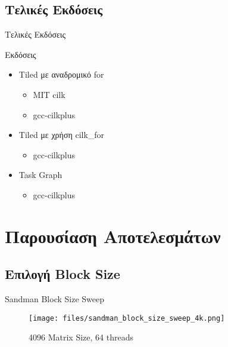 \documentclass{beamer}
\begin{document}
\subsection{Τελικές Εκδόσεις}
\begin{frame}{Τελικές Εκδόσεις}
    \begin{block}{Εκδόσεις }
        \begin{itemize}
            \item<1-> Tiled με αναδρομικό for
                \begin{itemize}
                    \item<2-> MIT cilk
                    \item<3-> gcc-cilkplus
                \end{itemize}
            \item<4-> Tiled με χρήση cilk\_for
                \begin{itemize}
                    \item<5-> gcc-cilkplus
                \end{itemize}
            \item<6-> Task Graph
                \begin{itemize}
                    \item<7-> gcc-cilkplus
                \end{itemize}
        \end{itemize}
    \end{block}
\end{frame}



\section{Παρουσίαση Αποτελεσμάτων}

\subsection{Επιλογή Block Size}
    \begin{frame}
        \begin{block}{Sandman Block Size Sweep}
            \begin{figure}[H]
                \centering
                \texttt{[image: files/sandman\_block\_size\_sweep\_4k.png]}
                \caption{4096 Matrix Size, 64 threads}
            \end{figure}
        \end{block}
    \end{frame}
\end{document}
